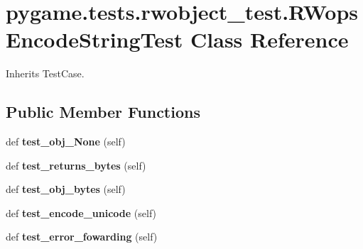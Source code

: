 \hypertarget{classpygame_1_1tests_1_1rwobject__test_1_1_r_wops_encode_string_test}{}\section{pygame.\+tests.\+rwobject\+\_\+test.\+R\+Wops\+Encode\+String\+Test Class Reference}
\label{classpygame_1_1tests_1_1rwobject__test_1_1_r_wops_encode_string_test}


Inherits Test\+Case.

\subsection*{Public Member Functions}
\begin{DoxyCompactItemize}
\item 
\mbox{\label{classpygame_1_1tests_1_1rwobject__test_1_1_r_wops_encode_string_test_a29142b065db71c284a4ba1ca78931278}} 
def {\bfseries test\+\_\+obj\+\_\+\+None} (self)
\item 
\mbox{\label{classpygame_1_1tests_1_1rwobject__test_1_1_r_wops_encode_string_test_a24bcbb155a86e9d940e45b523caa30b4}} 
def {\bfseries test\+\_\+returns\+\_\+bytes} (self)
\item 
\mbox{\label{classpygame_1_1tests_1_1rwobject__test_1_1_r_wops_encode_string_test_aa567d970a24712136264670ff32a7c4c}} 
def {\bfseries test\+\_\+obj\+\_\+bytes} (self)
\item 
\mbox{\label{classpygame_1_1tests_1_1rwobject__test_1_1_r_wops_encode_string_test_a980f889e882db25834789c2b3ae1b841}} 
def {\bfseries test\+\_\+encode\+\_\+unicode} (self)
\item 
\mbox{\label{classpygame_1_1tests_1_1rwobject__test_1_1_r_wops_encode_string_test_ae03e9ef0a8a0995b16b09b41e2b39428}} 
def {\bfseries test\+\_\+error\+\_\+fowarding} (self)
\item 

\end{DoxyCompactItemize}
